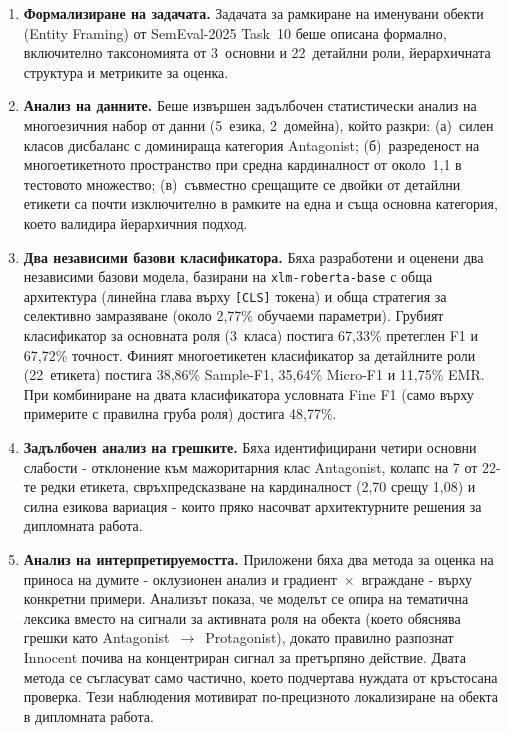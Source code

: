 \documentclass[12pt,a4paper]{report}
\begin{document}
\begin{enumerate}
  \item \textbf{Формализиране на задачата.} Задачата за рамкиране на именувани обекти (Entity Framing) от SemEval-2025 Task~10 беше описана формално, включително таксономията от 3~основни и 22~детайлни роли, йерархичната структура и метриките за оценка.

  \item \textbf{Анализ на данните.} Беше извършен задълбочен статистически анализ на многоезичния набор от данни (5~езика, 2~домейна), който разкри: (а)~силен класов дисбаланс с доминираща категория Antagonist; (б)~разреденост на многоетикетното пространство при средна кардиналност от около~1,1 в тестовото множество; (в)~съвместно срещащите се двойки от детайлни етикети са почти изключително в рамките на една и съща основна категория, което валидира йерархичния подход.

  \item \textbf{Два независими базови класификатора.} Бяха разработени и оценени два независими базови модела, базирани на \texttt{xlm-roberta-base} с обща архитектура (линейна глава върху \texttt{[CLS]} токена) и обща стратегия за селективно замразяване (около 2,77\% обучаеми параметри). Грубият класификатор за основната роля (3~класа) постига 67,33\% претеглен F1 и 67,72\% точност. Финият многоетикетен класификатор за детайлните роли (22~етикета) постига 38,86\% Sample-F1, 35,64\% Micro-F1 и 11,75\% EMR. При комбиниране на двата класификатора условната Fine F1 (само върху примерите с правилна груба роля) достига 48,77\%.

  \item \textbf{Задълбочен анализ на грешките.} Бяха идентифицирани четири основни слабости - отклонение към мажоритарния клас Antagonist, колапс на 7 от 22-те редки етикета, свръхпредсказване на кардиналност (2,70 срещу 1,08) и силна езикова вариация - които пряко насочват архитектурните решения за дипломната работа.

  \item \textbf{Анализ на интерпретируемостта.} Приложени бяха два метода за оценка на приноса на думите - оклузионен анализ и градиент~$\times$~вграждане - върху конкретни примери. Анализът показа, че моделът се опира на тематична лексика вместо на сигнали за активната роля на обекта (което обяснява грешки като Antagonist~$\to$~Protagonist), докато правилно разпознат Innocent почива на концентриран сигнал за претърпяно действие. Двата метода се съгласуват само частично, което подчертава нуждата от кръстосана проверка. Тези наблюдения мотивират по-прецизното локализиране на обекта в дипломната работа.
\end{enumerate}
\end{document}
